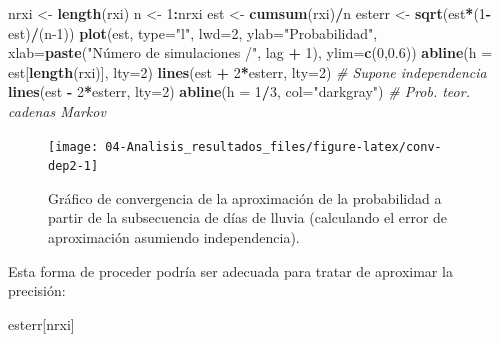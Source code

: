 \documentclass[
]{book}
\newenvironment{Shaded}{\begin{snugshade}}{\end{snugshade}}
\newcommand{\CommentTok}[1]{\textcolor[rgb]{0.56,0.35,0.01}{\textit{#1}}}
\newcommand{\DataTypeTok}[1]{\textcolor[rgb]{0.13,0.29,0.53}{#1}}
\newcommand{\DecValTok}[1]{\textcolor[rgb]{0.00,0.00,0.81}{#1}}
\newcommand{\FloatTok}[1]{\textcolor[rgb]{0.00,0.00,0.81}{#1}}
\newcommand{\KeywordTok}[1]{\textcolor[rgb]{0.13,0.29,0.53}{\textbf{#1}}}
\newcommand{\NormalTok}[1]{#1}
\newcommand{\OperatorTok}[1]{\textcolor[rgb]{0.81,0.36,0.00}{\textbf{#1}}}
\newcommand{\StringTok}[1]{\textcolor[rgb]{0.31,0.60,0.02}{#1}}
\theoremstyle{break}
\theoremstyle{definition}
\theoremstyle{definition}
\theoremstyle{definition}
\theoremstyle{remark}
\begin{document}
\begin{Shaded}
\begin{Highlighting}[]
\NormalTok{nrxi <-}\StringTok{ }\KeywordTok{length}\NormalTok{(rxi)}
\NormalTok{n <-}\StringTok{ }\DecValTok{1}\OperatorTok{:}\NormalTok{nrxi}
\NormalTok{est <-}\StringTok{ }\KeywordTok{cumsum}\NormalTok{(rxi)}\OperatorTok{/}\NormalTok{n}
\NormalTok{esterr <-}\StringTok{ }\KeywordTok{sqrt}\NormalTok{(est}\OperatorTok{*}\NormalTok{(}\DecValTok{1}\OperatorTok{-}\NormalTok{est)}\OperatorTok{/}\NormalTok{(n}\DecValTok{-1}\NormalTok{))}
\KeywordTok{plot}\NormalTok{(est, }\DataTypeTok{type=}\StringTok{"l"}\NormalTok{, }\DataTypeTok{lwd=}\DecValTok{2}\NormalTok{, }\DataTypeTok{ylab=}\StringTok{"Probabilidad"}\NormalTok{, }
     \DataTypeTok{xlab=}\KeywordTok{paste}\NormalTok{(}\StringTok{"Número de simulaciones /"}\NormalTok{, lag }\OperatorTok{+}\StringTok{ }\DecValTok{1}\NormalTok{), }\DataTypeTok{ylim=}\KeywordTok{c}\NormalTok{(}\DecValTok{0}\NormalTok{,}\FloatTok{0.6}\NormalTok{))}
\KeywordTok{abline}\NormalTok{(}\DataTypeTok{h =}\NormalTok{ est[}\KeywordTok{length}\NormalTok{(rxi)], }\DataTypeTok{lty=}\DecValTok{2}\NormalTok{)}
\KeywordTok{lines}\NormalTok{(est }\OperatorTok{+}\StringTok{ }\DecValTok{2}\OperatorTok{*}\NormalTok{esterr, }\DataTypeTok{lty=}\DecValTok{2}\NormalTok{) }\CommentTok{# Supone independencia}
\KeywordTok{lines}\NormalTok{(est }\OperatorTok{-}\StringTok{ }\DecValTok{2}\OperatorTok{*}\NormalTok{esterr, }\DataTypeTok{lty=}\DecValTok{2}\NormalTok{)}
\KeywordTok{abline}\NormalTok{(}\DataTypeTok{h =} \DecValTok{1}\OperatorTok{/}\DecValTok{3}\NormalTok{, }\DataTypeTok{col=}\StringTok{"darkgray"}\NormalTok{)     }\CommentTok{# Prob. teor. cadenas Markov}
\end{Highlighting}
\end{Shaded}

\begin{figure}[!htb]

{\centering \texttt{[image: 04-Analisis\_resultados\_files/figure-latex/conv-dep2-1]} 

}

\caption{Gráfico de convergencia de la aproximación de la probabilidad a partir de la subsecuencia de días de lluvia (calculando el error de aproximación asumiendo independencia).}\label{fig:conv-dep2}
\end{figure}

Esta forma de proceder podría ser adecuada para tratar de aproximar la precisión:

\begin{Shaded}
\begin{Highlighting}[]
\NormalTok{esterr[nrxi]}
\end{Highlighting}
\end{Shaded}
\end{document}
